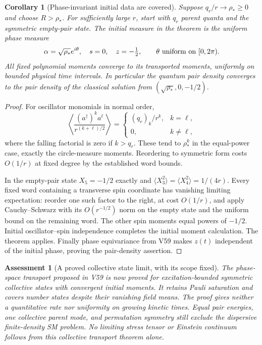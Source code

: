 \documentclass[11pt]{article}
\newtheorem{corollary}[theorem]{Corollary}
\newtheorem{assessment}[theorem]{Assessment}
\theoremstyle{remark}
\begin{document}
\begin{corollary}[Phase-invariant initial data are covered]
\label{cor:v20v61-number}
Suppose \(q_r/r\to\rho_*\geq0\) and choose \(R>\rho_*\).
For sufficiently large \(r\), start with \(q_r\) parent
quanta and the symmetric empty-pair state.  The initial
measure in the theorem is the uniform phase measure
\[
 \alpha=\sqrt{\rho_*}e^{i\theta},\quad
 s=0,\quad z=-\tfrac12,\qquad
 \theta\ \hbox{uniform on }[0,2\pi).
\]
All fixed polynomial moments converge to its transported
moments, uniformly on bounded physical time intervals.
In particular the quantum pair density converges to the
pair density of the classical solution from
\((\sqrt{\rho_*},0,-1/2)\).
\end{corollary}
\begin{proof}
For oscillator monomials in normal order,
\[
 \left\langle
 \frac{(a^\dagger)^k a^\ell}{r^{(k+\ell)/2}}
 \right\rangle
 =\begin{cases}(q_r)_k/r^k,&k=\ell,\\0,&k\ne\ell,\end{cases}
\]
where the falling factorial is zero if \(k>q_r\).
These tend to \(\rho_*^k\) in the equal-power case,
exactly the circle-measure moments.  Reordering to
symmetric form costs \(O(1/r)\) at fixed degree by
the established word bounds.

In the empty-pair state \(X_5=-1/2\) exactly and
\(\langle X_3^2\rangle=\langle X_4^2\rangle=1/(4r)\).
Every fixed word containing a transverse spin coordinate
has vanishing limiting expectation: reorder one such
factor to the right, at cost \(O(1/r)\), and apply
Cauchy--Schwarz with its \(O(r^{-1/2})\) norm on the
empty state and the uniform bound on the remaining word.
The other spin moments equal powers of \(-1/2\).
Initial oscillator--spin independence completes the
initial moment calculation.  The theorem applies.
Finally phase equivariance from V59 makes \(z(t)\)
independent of the initial phase, proving the
pair-density assertion.
\end{proof}

\begin{assessment}[A proved collective state limit, with its scope fixed]
\label{ass:v20v61}
The phase-space transport proposed in V59 is now proved
for excitation-bounded symmetric collective states with
convergent initial moments.  It retains Pauli saturation
and covers number states despite their vanishing field
means.  The proof gives neither a quantitative rate nor
uniformity on growing kinetic times.  Equal pair energies,
one collective parent mode, and permutation symmetry
still exclude the dispersive finite-density SM problem.
No limiting stress tensor or Einstein continuum follows
from this collective transport theorem alone.
\end{assessment}
\end{document}
